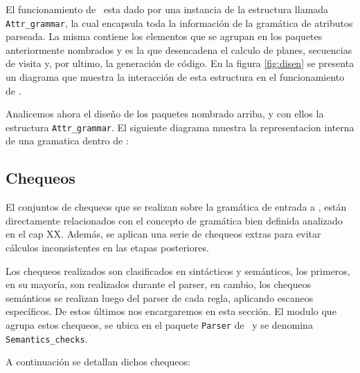 El funcionamiento de \maggen\ esta dado por una instancia de la estructura llamada \texttt{Attr\_grammar}, la cual encapsula toda la información de la gramática de atributos parseada. La misma contiene los elementos que se agrupan en los paquetes anteriormente nombrados y es la que desencadena el calculo de planes, secuencias de visita y, por ultimo, la generación de código.  
En la figura \ref{fig:disen} se presenta un diagrama que muestra la interacción de esta estructura en el funcionamiento de \maggen.

Analicemos ahora el diseño de los paquetes nombrado arriba, y con ellos la estructura \texttt{Attr\_grammar}.  El siguiente diagrama muestra la representacion interna de una gramatica dentro de \maggen:



\subsection*{Chequeos}

El conjuntos de chequeos que se realizan sobre la gramática de entrada a \maggen, están directamente relacionados con el concepto de gramática bien definida analizado en el cap XX. Además, se aplican una serie de chequeos extras para evitar cálculos inconsistentes en las etapas posteriores. 

Los chequeos realizados son clasificados en sintácticos y semánticos, los primeros, en su mayoría, son realizados durante el parser, en cambio, los chequeos semánticos se realizan luego del parser de cada regla, aplicando escaneos específicos. De estos últimos nos encargaremos en esta sección.
El modulo que agrupa estos chequeos, se ubica en el paquete \texttt{Parser} de \maggen\ y se denomina \texttt{Semantics\_checks}.

A continuación se detallan dichos chequeos:


